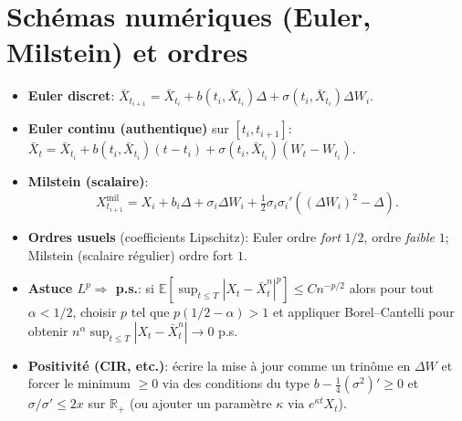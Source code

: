\documentclass[11pt,a4paper]{article}
\newcommand{\E}{\mathbb{E}}
\newcommand{\R}{\mathbb{R}}
\newcommand{\1}{\mathbbm{1}}
\theoremstyle{plain}
\theoremstyle{definition}
\begin{document}
\section{Schémas numériques (Euler, Milstein) et ordres}
\begin{itemize}[leftmargin=*]
  \item \textbf{Euler discret}:
  $\bar X_{t_{i+1}}=\bar X_{t_i}+b(t_i,\bar X_{t_i})\Delta+\sigma(t_i,\bar X_{t_i})\Delta W_i$.
  \item \textbf{Euler continu (authentique)} sur $[t_i,t_{i+1}]$:
  $\bar X_t=\bar X_{t_i}+b(t_i,\bar X_{t_i})(t-t_i)+\sigma(t_i,\bar X_{t_i})(W_t-W_{t_i})$.
  \item \textbf{Milstein (scalaire)}:
  \[
  X_{t_{i+1}}^{\mathrm{mil}}=X_i+b_i\Delta+\sigma_i\Delta W_i+\tfrac12\sigma_i\sigma_i'((\Delta W_i)^2-\Delta).
  \]
  \item \textbf{Ordres usuels} (coefficients Lipschitz):
  Euler ordre \emph{fort} $1/2$, ordre \emph{faible} $1$; Milstein (scalaire régulier) ordre fort $1$.
  \item \textbf{Astuce $L^p\Rightarrow$ p.s.}:
  si $\E[\sup_{t\le T}|X_t-\bar X_t^n|^p]\le Cn^{-p/2}$ alors pour tout $\alpha<1/2$, choisir $p$ tel que $p(1/2-\alpha)>1$ et appliquer Borel--Cantelli pour obtenir $n^\alpha\sup_{t\le T}|X_t-\bar X_t^n|\to 0$ p.s.
  \item \textbf{Positivité (CIR, etc.)}: écrire la mise à jour comme un trinôme en $\Delta W$ et forcer le minimum $\ge 0$ via des conditions du type
  $b-\frac14(\sigma^2)'\ge 0$ et $\sigma/\sigma'\le 2x$ sur $\R_+$ (ou ajouter un paramètre $\kappa$ via $e^{\kappa t}X_t$).
\end{itemize}
\end{document}
